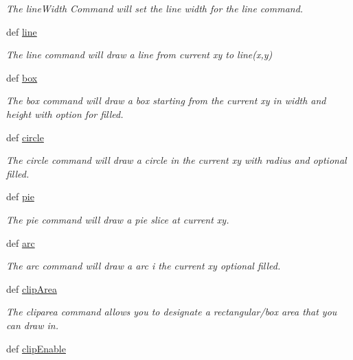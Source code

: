\begin{DoxyCompactItemize}
\begin{DoxyCompactList}\small\item\em The line\-Width Command will set the line width for the line command. \end{DoxyCompactList}\item 
def \hyperlink{group___drawing_gae70c22a0a810a70a0dd6d32c9fd7c066}{line}
\begin{DoxyCompactList}\small\item\em The line command will draw a line from current xy to line(x,y) \end{DoxyCompactList}\item 
def \hyperlink{group___drawing_ga63bb01e1f5ef0fe2ae2acec0ed90e5bd}{box}
\begin{DoxyCompactList}\small\item\em The box command will draw a box starting from the current xy in width and height with option for filled. \end{DoxyCompactList}\item 
def \hyperlink{group___drawing_gabfcfb31f2d88c7397332abcc6b324c7c}{circle}
\begin{DoxyCompactList}\small\item\em The circle command will draw a circle in the current xy with radius and optional filled. \end{DoxyCompactList}\item 
def \hyperlink{group___drawing_ga12fb93d2d6f7ce3f08ad988c09624d57}{pie}
\begin{DoxyCompactList}\small\item\em The pie command will draw a pie slice at current xy. \end{DoxyCompactList}\item 
def \hyperlink{group___drawing_ga13a0a8fb9c906a687f2a42864d973cc1}{arc}
\begin{DoxyCompactList}\small\item\em The arc command will draw a arc i the current xy optional filled. \end{DoxyCompactList}\item 
def \hyperlink{group___drawing_ga2f55674143f1e4b06e42f09aaf0da71c}{clip\-Area}
\begin{DoxyCompactList}\small\item\em The cliparea command allows you to designate a rectangular/box area that you can draw in. \end{DoxyCompactList}\item 
def \hyperlink{group___drawing_gabd1433160288289495e6c006e77951e6}{clip\-Enable}

\end{DoxyCompactItemize}
